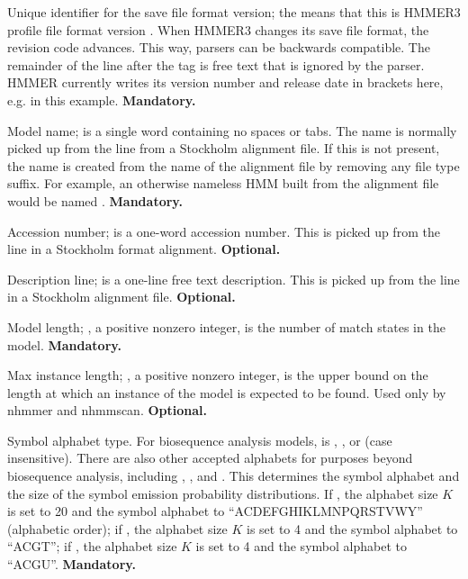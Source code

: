 \begin{sreitems}{}

\item [\monob{HMMER3/\HMMERfmtversion{}}] Unique identifier for the save file format
  version; the \mono{/\HMMERfmtversion{}} means that this is HMMER3 profile file format
  version \HMMERfmtversion{}. When HMMER3 changes its save file format, the revision
  code advances. This way, parsers can be backwards
  compatible. The remainder of the line after the  tag
  is free text that is ignored by the parser. HMMER currently writes
  its version number and release date in brackets here,
  e.g. \mono{\HMMERsavestamp{}} in this
  example. \textbf{Mandatory.}

\item [\monob{NAME <s>}] Model name;  is a single word
containing no spaces or tabs. The name is normally picked up from the
 line from a Stockholm alignment file.  If this is not
present, the name is created from the name of the alignment file by
removing any file type suffix. For example, an otherwise nameless HMM
built from the alignment file  would be named
.  \textbf{Mandatory.}

\item [\monob{ACC <s>}] Accession number;  is a one-word
accession number. This is picked up from the  line in a
Stockholm format alignment. \textbf{Optional.}

\item [\monob{DESC <s>}] Description line;  is a one-line
free text description. This is picked up from the  line
in a Stockholm alignment file. \textbf{Optional.}

\item [\monob{LENG <d>}] Model length; , a positive nonzero
integer, is the number of match states in the model.
\textbf{Mandatory.}

\item [\monob{MAXL <d>}] Max instance length; , a positive
nonzero integer, is the upper bound on the length at which an instance
of the model is expected to be found. Used only by nhmmer and nhmmscan.
\textbf{Optional.}

\item [\monob{ALPH <s>}] Symbol alphabet type. For biosequence
analysis models,  is , , or 
(case insensitive). There are also other accepted alphabets for
purposes beyond biosequence analysis, including ,
, and . This determines the symbol alphabet
and the size of the symbol emission probability distributions.  If
, the alphabet size $K$ is set to 20 and the symbol
alphabet to ``ACDEFGHIKLMNPQRSTVWY'' (alphabetic order); if
, the alphabet size $K$ is set to 4 and the symbol alphabet
to ``ACGT''; if , the alphabet size $K$ is set to 4 and the
symbol alphabet to ``ACGU''. \textbf{Mandatory.}


\end{sreitems}
